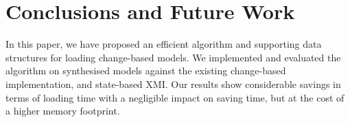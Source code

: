 \documentclass{llncs}
\begin{document}



\section{Conclusions and Future Work}
\label{sec:conclusions}
In this paper, we have proposed an efficient algorithm and supporting data structures for loading change-based models.
We implemented and evaluated the algorithm on synthesised models against the existing change-based implementation, and state-based XMI. 
Our results show considerable savings in terms of loading time with a negligible impact on saving time, but at the cost of a higher memory footprint.
\end{document}
